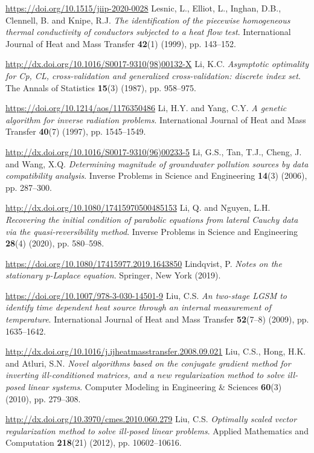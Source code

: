 \begin{thebibliography}{301}
\url{https://doi.org/10.1515/jiip-2020-0028}
%
%
 Lesnic, L., Elliot, L., Inghan, D.B., Clennell, B. and Knipe, R.J. {\it The identification of the piecewise homogeneous thermal conductivity of conductors subjected to a heat flow test}. International Journal of Heat and Mass Transfer {\bf 42}(1) (1999), pp. 143--152.

\url{http://dx.doi.org/10.1016/S0017-9310(98)00132-X} 
%
%
 Li, K.C. {\it Asymptotic optimality for Cp, CL, cross-validation and generalized cross-validation: discrete index set}. The Annals of Statistics {\bf 15}(3) (1987), pp. 958--975.

\url{https://doi.org/10.1214/aos/1176350486}
%
%
 Li, H.Y. and Yang, C.Y. {\it A genetic algorithm for inverse radiation problems}. International Journal of Heat and Mass Transfer {\bf 40}(7) (1997), pp. 1545--1549.

\url{http://dx.doi.org/10.1016/S0017-9310(96)00233-5} 
%
%
 Li, G.S., Tan, T.J., Cheng, J. and Wang, X.Q. {\it Determining magnitude of groundwater pollution sources by data compatibility analysis}. Inverse Problems in Science and Engineering {\bf 14}(3) (2006), pp. 287--300.

\url{http://dx.doi.org/10.1080/17415970500485153} 
%
%
 Li, Q. and Nguyen, L.H. {\it Recovering the initial condition of parabolic equations from lateral Cauchy data via the quasi-reversibility method}. Inverse Problems in Science and Engineering {\bf 28}(4) (2020), pp. 580--598.

\url{https://doi.org/10.1080/17415977.2019.1643850}
%
%
 Lindqvist, P. {\it Notes on the stationary p-Laplace equation}. Springer, New York (2019).

\url{https://doi.org/10.1007/978-3-030-14501-9} 
%
%
 Liu, C.S. {\it An two-stage LGSM to identify time dependent heat source through an internal measurement of temperature}. International Journal of Heat and Mass Transfer {\bf 52}(7--8) (2009), pp. 1635--1642.

\url{http://dx.doi.org/10.1016/j.ijheatmasstransfer.2008.09.021}
%
%
 Liu, C.S., Hong, H.K. and Atluri, S.N. {\it Novel algorithms based on the conjugate gradient method for inverting ill-conditioned matrices, and a new regularization method to solve ill-posed linear systems}. Computer Modeling in Engineering \& Sciences {\bf 60}(3) (2010), pp. 279--308.

\url{http://dx.doi.org/10.3970/cmes.2010.060.279}
%
%
 Liu, C.S. {\it Optimally scaled vector regularization method to solve ill-posed linear problems}. Applied Mathematics and Computation {\bf 218}(21) (2012), pp. 10602--10616.


\end{thebibliography}
